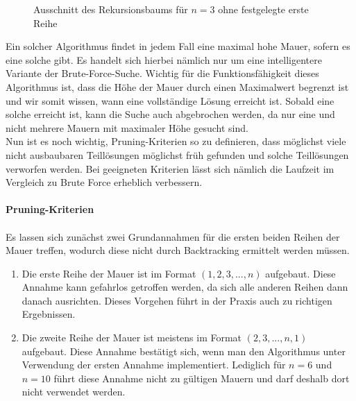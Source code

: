 \documentclass[a4paper, notitlepage, 12pt]{scrartcl}
\begin{document}
\begin{figure}[H]
\centering {}
\caption{Ausschnitt des Rekursionsbaums für $n = 3$ ohne festgelegte erste Reihe}
\end{figure}
Ein solcher Algorithmus findet in jedem Fall eine maximal hohe Mauer, sofern es eine solche gibt. Es handelt sich hierbei nämlich nur um eine intelligentere Variante der Brute-Force-Suche. Wichtig für die Funktionsfähigkeit dieses Algorithmus ist, dass die Höhe der Mauer durch einen Maximalwert begrenzt ist und wir somit wissen, wann eine vollständige Lösung erreicht ist. Sobald eine solche erreicht ist, kann die Suche auch abgebrochen werden, da nur eine und nicht mehrere Mauern mit maximaler Höhe gesucht sind.
\\
Nun ist es noch wichtig, Pruning-Kriterien so zu definieren, dass möglichst viele nicht ausbaubaren Teillösungen möglichst früh gefunden und solche Teillösungen verworfen werden. Bei geeigneten Kriterien lässt sich nämlich die Laufzeit im Vergleich zu Brute Force erheblich verbessern.
\\ \\
\textbf{Pruning-Kriterien}
\\ \\
Es lassen sich zunächst zwei Grundannahmen für die ersten beiden Reihen der Mauer treffen, wodurch diese nicht durch Backtracking ermittelt werden müssen.
\begin{enumerate}
\item Die erste Reihe der Mauer ist im Format $(1,2,3,...,n)$ aufgebaut. Diese Annahme kann gefahrlos getroffen werden, da sich alle anderen Reihen dann danach ausrichten. Dieses Vorgehen führt in der Praxis auch zu richtigen Ergebnissen.
\item Die zweite Reihe der Mauer ist meistens im Format $(2,3,...,n,1)$ aufgebaut. Diese Annahme bestätigt sich, wenn man den Algorithmus unter Verwendung der ersten Annahme implementiert. Lediglich für $n = 6$ und $n = 10$ führt diese Annahme nicht zu gültigen Mauern und darf deshalb dort nicht verwendet werden.
\end{enumerate}
\end{document}
